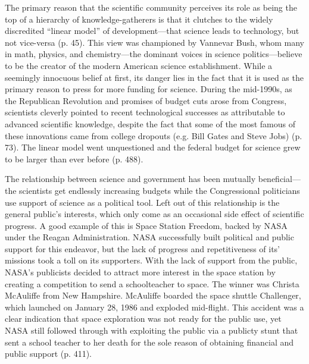 \documentclass{article}[12pt]
\begin{document}
The primary reason that the scientific community perceives its role as being
the top of a hierarchy of knowledge-gatherers is that it clutches to the widely
discredited ``linear model'' of development---that science leads to technology,
but not vice-versa (p. 45). This view was championed by Vannevar Bush, whom
many in math, physics, and chemistry---the dominant voices in science
politics---believe to be the creator of the modern American science
establishment. While a seemingly innocuous belief at first, its danger lies in
the fact that it is used as the primary reason to press for more funding for
science. During the mid-1990s, as the Republican Revolution and promises of
budget cuts arose from Congress, scientists cleverly pointed to recent
technological successes as attributable to advanced scientific knowledge,
despite the fact that some of the most famous of these innovations came from
college dropouts (e.g. Bill Gates and Steve Jobs) (p. 73). The linear model
went unquestioned and the federal budget for science grew to be larger than
ever before (p. 488).

The relationship between science and government has been mutually
beneficial---the scientists get endlessly increasing budgets while the
Congressional politicians use support of science as a political tool. Left out
of this relationship is the general public's interests, which only come as an
occasional side effect of scientific progress. A good example of this is Space
Station Freedom, backed by NASA under the Reagan Administration.  NASA
successfully built political and public support for this endeavor, but the lack
of progress and repetitiveness of its' missions took a toll on its supporters.  With the lack of
support from the public, NASA's publicists decided to attract more interest in
the space station by creating a competition to send a schoolteacher to space.
The winner was Christa McAuliffe from New Hampshire.  McAuliffe boarded the
space shuttle Challenger, which launched on January 28, 1986 and exploded
mid-flight.  This accident was a clear indication that space exploration was
not ready for the public use, yet NASA still followed through with exploiting
the public via a publicty stunt that sent a school teacher to her death for the
sole reason of obtaining financial and public support (p. 411).
\end{document}
